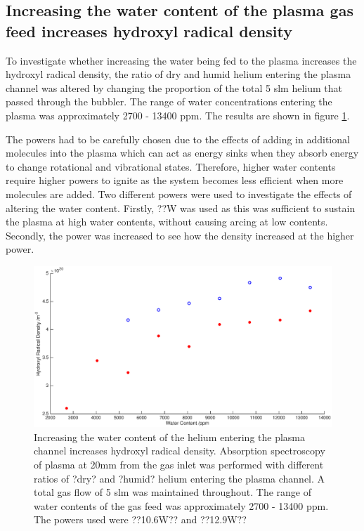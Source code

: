 \documentclass[11pt, oneside]{article}   	%
\begin{document}
\subsection{Increasing the water content of the plasma gas feed increases hydroxyl radical density}

To investigate whether increasing the water being fed to the plasma increases the hydroxyl radical density, the ratio of dry and humid helium entering the plasma channel was altered by changing the proportion of the total 5 slm helium that passed through the bubbler. The range of water concentrations entering the plasma was approximately 2700 - 13400 ppm. The results are shown in figure \ref{fig:BubblerVariation}.

The powers had to be carefully chosen due to the effects of adding in additional molecules into the plasma which can act as energy sinks when they absorb energy to change rotational and vibrational states. 
Therefore, higher water contents require higher powers to ignite as the system becomes less efficient when more molecules are added.
Two different powers were used to investigate the effects of altering the water content. Firstly, ??W was used as this was sufficient to sustain the plasma at high water contents, without causing arcing at low contents. Secondly, the power was increased to see how the density increased at the higher power. 

\begin{figure}
    \centering
    \includegraphics[width=\textwidth]{Figures/BubblerVariation}
    \caption{Increasing the water content of the helium entering the plasma channel increases hydroxyl radical density. Absorption spectroscopy of plasma at 20mm from the gas inlet was performed with different ratios of ?dry? and ?humid? helium entering the plasma channel. A total gas flow of 5 slm was maintained throughout. The range of water contents of the gas feed was approximately 2700 - 13400 ppm. The powers used were ??10.6W?? and ??12.9W??}
    \label{fig:BubblerVariation}
\end{figure}
\end{document}
